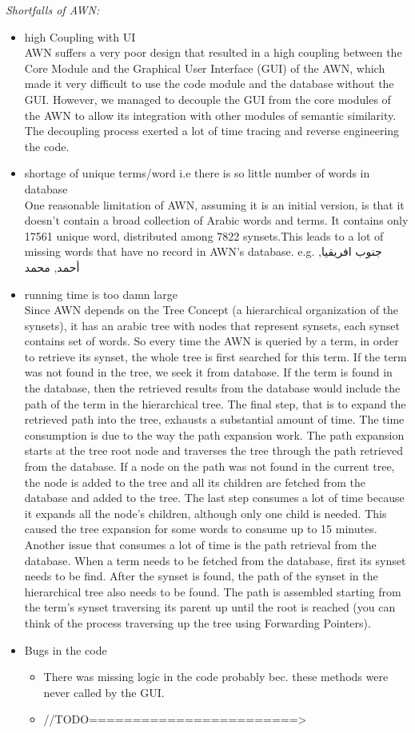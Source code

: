 \textit{Shortfalls of AWN:}
\begin{itemize}
\item high Coupling with UI\\
AWN suffers a very poor design that resulted in a high coupling between the Core Module and the Graphical User Interface (GUI) of the AWN, which made it very difficult to use the code module and the database without the GUI. However, we managed to decouple the GUI from the core modules of the AWN to allow its integration with other modules of semantic similarity. The decoupling process exerted a lot of time tracing and reverse engineering the code.
\item shortage of unique terms/word i.e there is so little number of words in database\\
       One reasonable limitation of AWN, assuming it is an initial version, is that it doesn’t contain a broad collection of Arabic words and terms. It contains only 17561 unique word, distributed among 7822 synsets.This leads to a lot of missing words that have no record in AWN’s database. e.g.  جنوب افريقيا, أحمد, محمد
\item running time is too damn large\\
Since AWN depends on the Tree Concept (a hierarchical organization of the synsets), it has an arabic tree with nodes that represent synsets, each synset contains set of words. So every time the AWN is queried by a term, in order to retrieve its synset, the whole tree is first searched for this term. If the term was not found in the tree, we seek it from database. If the term is found in the database, then the retrieved results from the database would include the path of the term in the hierarchical tree. The final step, that is to expand the retrieved path into the tree, exhausts a substantial amount of time. The time consumption is due to the way the path expansion work. The path expansion starts at the tree root node and traverses the tree through the path retrieved from the database. If a node on the path was not found in the current tree, the node is added to the tree and all its children are fetched from the database and added to the tree. The last step consumes a lot of time because it expands all the node’s children, although only one child is needed. This caused the tree expansion for some words to consume up to 15 minutes.
Another issue that consumes a lot of time is the path retrieval from the database. When a term needs to be fetched from the database, first its synset needs to be find. After the synset is found, the path of the synset in the hierarchical tree also needs to be found. The path is assembled starting from the term’s synset traversing its parent up until the root is reached (you can think of the process traversing up the tree using Forwarding Pointers). 
\item Bugs in the code\\
\begin{itemize}
\item There was missing logic in the code probably bec. these methods were never called by the GUI.
\item //TODO========================>
\end{itemize}
\end{itemize}
  

